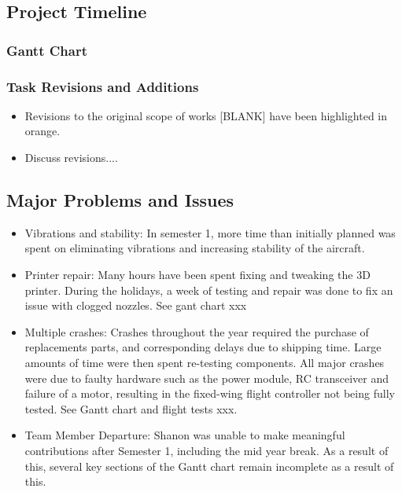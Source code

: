 \subsection{Project Timeline}
\subsubsection*{Gantt Chart}


\subsubsection*{Task Revisions and Additions}

\begin{itemize}
	\item Revisions to the original scope of works [BLANK] have been highlighted in orange.
	
	\item Discuss revisions....

\end{itemize}

\subsection{Major Problems and Issues}
\begin{itemize}
	\item Vibrations and stability: In semester 1, more time than initially planned was spent on eliminating vibrations and increasing stability of the aircraft. 
	
	\item Printer repair: Many hours have been spent fixing and tweaking the 3D printer.  During the holidays, a week of testing and repair was done to fix an issue with clogged nozzles. See gant chart xxx
	
	\item Multiple crashes: Crashes throughout the year required the purchase of replacements parts, and corresponding delays due to shipping time. Large amounts of time were then spent re-testing components. All major crashes were due to faulty hardware such as the power module, RC transceiver and failure of a motor, resulting in the fixed-wing flight controller not being fully tested. See Gantt chart and flight tests xxx.
	
	\item Team Member Departure: Shanon was unable to make meaningful contributions after Semester 1, including the mid year break. As a result of this, several key sections of the Gantt chart remain incomplete as a result of this.
\end{itemize}

